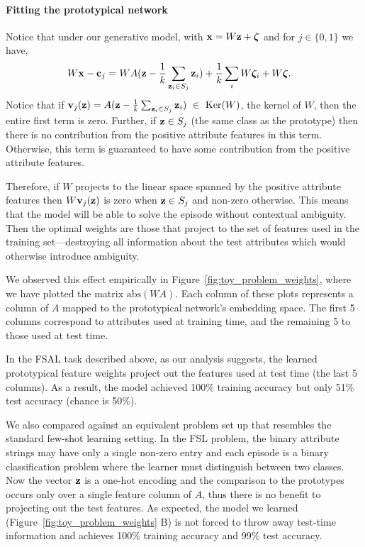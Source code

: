 \paragraph{Fitting the prototypical network}
Notice that under our generative model, with $\mathbf{x} = W\mathbf{z} + \boldsymbol{\zeta}$ and for $j \in \{0, 1\}$ we have,
\begin{align*}
W\bx - \bc_j =\ & W A (\bz - \frac{1}{k}\sum_{\bz_i \in S_j} \bz_i) + %
\frac{1}{k}\sum_{i}W\bzeta_i +
W\bzeta.
\end{align*}
Notice that if ${\mathbf{v}}_j(\mathbf{z}) = A (\mathbf{z} - \frac{1}{k}\sum_{\mathbf{z}_i \in S_j} \mathbf{z}_i)~\in~\textrm{Ker}(W)$,
the kernel of $W$, then the entire first term is zero. Further, if $\mathbf{z} \in S_j$ (the same class as
the prototype) then there is no contribution from the positive attribute features in this term.
Otherwise, this term is guaranteed to have some contribution from the positive attribute features.

Therefore, if $W$ projects to the linear space spanned by the positive attribute features then
$W{\mathbf{v}}_j(\mathbf{z})$ is zero when $\mathbf{z} \in S_j$ and non-zero otherwise. This means that the model will be
able to solve the episode without contextual ambiguity. Then the optimal weights are those that
project to the set of features used in the training set---destroying all information about the test
attributes which would otherwise introduce ambiguity.

We observed this effect empirically in Figure~\ref{fig:toy_problem_weights}, where we have plotted
the matrix $\mathrm{abs}(WA)$. Each column of these plots represents a column of $A$ mapped to the
prototypical network's embedding space. The first 5 columns correspond to attributes used at
training time, and the remaining 5 to those used at test time.

In the FSAL task described above, as our analysis suggests, the learned prototypical feature
weights project out the features used at test time (the last 5 columns). As a result, the model
achieved 100\% training accuracy but only 51\% test accuracy (chance is 50\%).

We also compared against an equivalent problem set up that resembles the standard few-shot learning setting. In the FSL problem, the binary attribute strings may have only a single non-zero entry and each episode is a binary classification problem where the learner must distinguish between two classes. Now the vector $\mathbf{z}$ is a one-hot encoding and the comparison to the prototypes occurs only over a single feature column of $A$, thus there is no benefit to projecting out the test features. As expected, the model we learned (Figure~\ref{fig:toy_problem_weights} B) is not forced to throw away test-time information and achieves 100\% training accuracy and 99\% test accuracy.

